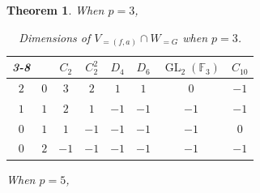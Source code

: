 \documentclass{amsart}
\newcommand{\GL}{\operatorname{GL}}
\numberwithin{equation}{section}
\newtheorem{theorem}{Theorem}[section]  %
\theoremstyle{definition}
\theoremstyle{remark}
\begin{document}
\begin{theorem}
When $p=3$,
\begin{table}[H]
\centering
\begin{tabular}{cc|c|c|c|c|c|c|}
\cline{3-8}
                                                &                           & \cellcolor[HTML]{a7c957}$C_2$ & \cellcolor[HTML]{a7c957}$C_2^2$ & \cellcolor[HTML]{a7c957}$D_4$ & \cellcolor[HTML]{a7c957}$D_6$ & \cellcolor[HTML]{a7c957}$\GL_2(\mathbb{F}_3)$ & \cellcolor[HTML]{a7c957}$C_{10}$ \\ \hline
\multicolumn{1}{|c|}{\cellcolor[HTML]{a7c957}$2$} & \cellcolor[HTML]{a7c957}$0$ & $3$                             & $2$                                       & $1$                             & $1$                             & $0$                    & {\color[HTML]{C0C0C0} $-1$}        \\ \hline
\multicolumn{1}{|c|}{\cellcolor[HTML]{a7c957}$1$} & \cellcolor[HTML]{a7c957}$1$ & $2$                             &  $1$                                       & {\color[HTML]{C0C0C0} $-1$}     & {\color[HTML]{C0C0C0} $-1$}     & {\color[HTML]{C0C0C0} $-1$}                     & {\color[HTML]{C0C0C0} $-1$}        \\ \hline
\multicolumn{1}{|c|}{\cellcolor[HTML]{a7c957}$0$} & \cellcolor[HTML]{a7c957}$1$ & $1$                             & {\color[HTML]{C0C0C0} $-1$}                 & {\color[HTML]{C0C0C0} $-1$}       & {\color[HTML]{C0C0C0} $-1$}       &  {\color[HTML]{C0C0C0} $-1$}               & $0$                                \\ \hline
\multicolumn{1}{|c|}{\cellcolor[HTML]{a7c957}$0$} & \cellcolor[HTML]{a7c957}$2$ & {\color[HTML]{C0C0C0} $-1$}                          & {\color[HTML]{C0C0C0} $-1$}                 & {\color[HTML]{C0C0C0} $-1$}       & {\color[HTML]{C0C0C0} $-1$}       &  {\color[HTML]{C0C0C0} $-1$}               & {\color[HTML]{C0C0C0} $-1$}                                \\ \hline
\end{tabular}
\caption{Dimensions of $V_{=(f,a)}\cap W_{= G}$ when $p=3$.}
\end{table}

When $p=5$,



\end{theorem}
\end{document}
